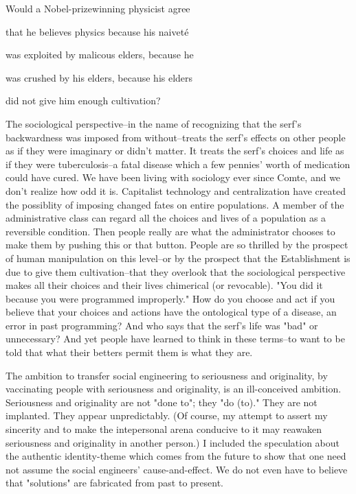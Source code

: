     Would a Nobel-prizewinning physicist agree

    that he believes physics because his naiveté

    was exploited by malicous elders, because he

    was crushed by his elders, because his elders

    did not give him enough cultivation?

The sociological perspective--in the name of recognizing that the serf's backwardness was imposed from without--treats the serf's effects on other people as if they were imaginary or didn't matter. It treats the serf's choices and life as if they were tuberculosis--a fatal disease which a few pennies' worth of medication could have cured. We have been living with sociology ever since Comte, and we don't realize how odd it is. Capitalist technology and centralization have created the possiblity of imposing changed fates on entire populations. A member of the administrative class can regard all the choices and lives of a population as a reversible condition. Then people really are what the administrator chooses to make them by pushing this or that button. People are so thrilled by the prospect of human manipulation on this level--or by the prospect that the Establishment is due to give them cultivation--that they overlook that the sociological perspective makes all their choices and their lives chimerical (or revocable). "You did it because you were programmed improperly." How do you choose and act if you believe that your choices and actions have the ontological type of a disease, an error in past programming? And who says that the serf's life was "bad" or unnecessary? And yet people have learned to think in these terms--to want to be told that what their betters permit them is what they are.

The ambition to transfer social engineering to seriousness and originality, by vaccinating people with seriousness and originality, is an ill-conceived ambition. Seriousness and originality are not "done to"; they "do (to)." They are not implanted. They appear unpredictably. (Of course, my attempt to assert my sincerity and to make the intepersonal arena conducive to it may reawaken seriousness and originality in another person.) I included the speculation about the authentic identity-theme which comes from the future to show that one need not assume the social engineers' cause-and-effect. We do not even have to believe that "solutions" are fabricated from past to present.


